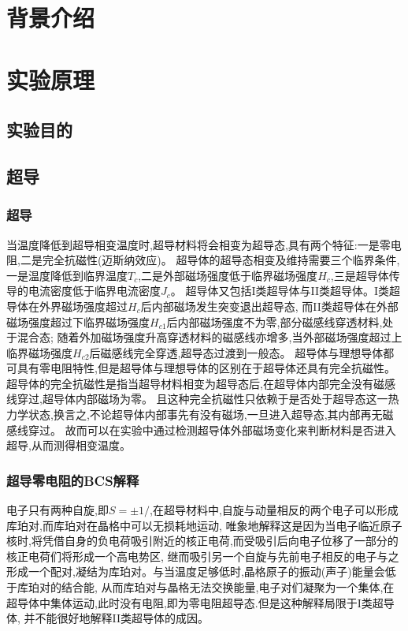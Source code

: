 \documentclass{spaexp}
\begin{document}
    \maketitle
    
    \section{背景介绍}
    \section{实验原理}
        \subsection{实验目的}
        \subsection{超导}
            \subsubsection{超导}
                当温度降低到超导相变温度时,超导材料将会相变为超导态,具有两个特征:一是零电阻,二是完全抗磁性(迈斯纳效应)。
                超导体的超导态相变及维持需要三个临界条件,一是温度降低到临界温度$T_c$,二是外部磁场强度低于临界磁场强度$H_c$,三是超导体传导的电流密度低于临界电流密度$J_c$。
                超导体又包括I类超导体与II类超导体。I类超导体在外界磁场强度超过$H_c$后内部磁场发生突变退出超导态,
                而II类超导体在外部磁场强度超过下临界磁场强度$H_{c1}$后内部磁场强度不为零,部分磁感线穿透材料,处于混合态;
                随着外加磁场强度升高穿透材料的磁感线亦增多,当外部磁场强度超过上临界磁场强度$H_{c2}$后磁感线完全穿透,超导态过渡到一般态。
                超导体与理想导体都可具有零电阻特性,但是超导体与理想导体的区别在于超导体还具有完全抗磁性。
                超导体的完全抗磁性是指当超导材料相变为超导态后,在超导体内部完全没有磁感线穿过,超导体内部磁场为零。
                且这种完全抗磁性只依赖于是否处于超导态这一热力学状态,换言之,不论超导体内部事先有没有磁场,一旦进入超导态,其内部再无磁感线穿过。
                故而可以在实验中通过检测超导体外部磁场变化来判断材料是否进入超导,从而测得相变温度。
            \subsubsection{超导零电阻的BCS解释}
                电子只有两种自旋,即$S= \pm 1/$,在超导材料中,自旋与动量相反的两个电子可以形成库珀对,而库珀对在晶格中可以无损耗地运动,
                唯象地解释这是因为当电子临近原子核时,将凭借自身的负电荷吸引附近的核正电荷,而受吸引后向电子位移了一部分的核正电荷们将形成一个高电势区,
                继而吸引另一个自旋与先前电子相反的电子与之形成一个配对,凝结为库珀对。与当温度足够低时,晶格原子的振动(声子)能量会低于库珀对的结合能,
                从而库珀对与晶格无法交换能量,电子对们凝聚为一个集体,在超导体中集体运动,此时没有电阻,即为零电阻超导态.但是这种解释局限于I类超导体,
                并不能很好地解释II类超导体的成因。
\end{document}
